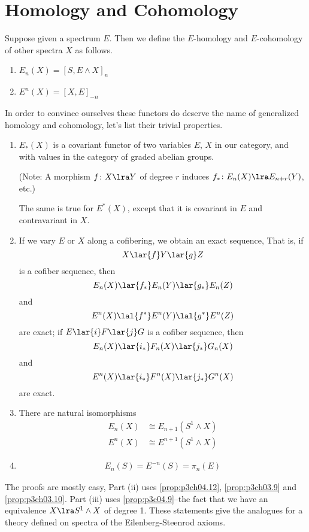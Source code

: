 \documentclass[../main]{subfiles}
\begin{document}
\label{sec:p3c06}
\chapter{Homology and Cohomology}


Suppose given a spectrum $E$. Then we define the $E$-homology and $E$-cohomology of other spectra $X$ as follows.
\begin{enumerate}
    \item $E_n(X) = [S, E \wedge X]_n$
    \item $E^n(X) = [X, E]_{-n}$
\end{enumerate}
In order to convince ourselves these functors do deserve the name of generalized homology and cohomology, let's list their trivial properties.
\begin{proposition}\label{prop:p3c06.1}
\begin{enumerate}
    \item $E_\ast(X)$ is a covariant functor of two variables $E$, $X$ in our category, and with values in the category of graded abelian groups.
    
    (Note: A morphism $f\colon X \lra Y$ of degree $r$ induces $f_\ast\colon E_n(X)\lra E_{n+r}(Y)$, etc.)
    
    The same is true for $E^\ast(X)$, except that it is covariant in $E$ and contravariant in $X$. 
    \item If we vary $E$ or $X$ along a cofibering, we obtain an exact sequence, That is, if
    \[X \lar{f} Y \lar{g} Z\]
    is a cofiber sequence, then
    \[E_n(X) \lar{f_\ast} E_n(Y) \lar{g_\ast}E_n(Z)\]
    and
    \[E^n(X) \lal{f^\ast} E^n(Y) \lal{g^\ast} E^n(Z)\]
    are exact; if $E \lar{i} F \lar{j} G$ is a cofiber sequence, then
    \[E_n(X) \lar{i_\ast} F_n(X) \lar{j_\ast} G_n(X)\]
    and
    \[E^n(X) \lar{i_\ast} F^n(X) \lar{j_\ast} G^n(X)\]
    are exact.
    \item There are natural isomorphisms
    \begin{align}
        E_n(X) &\cong E_{n+1}(S^1 \wedge X) \nonumber \\
        E^n(X) &\cong E^{n+1}(S^1 \wedge X)\nonumber
    \end{align}
    \item
    \begin{align}
        E_n(S)=E^{-n}(S)=\pi_n(E) \nonumber
    \end{align}
\end{enumerate}
\end{proposition}
The proofs are mostly easy, Part (ii) uses \ref{prop:p3ch04.12}, \ref{prop:p3ch03.9} and \ref{prop:p3ch03.10}. Part (iii) uses \ref{prop:p3c04.9}--the fact that we have an equivalence $X\lra S^1 \wedge X$ of degree 1. %
These statements give the analogues for a theory defined on spectra of the Eilenberg-Steenrod axioms.
\end{document}
